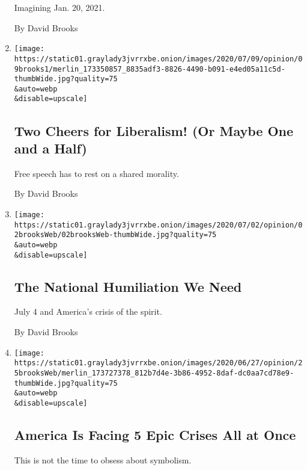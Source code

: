 \begin{enumerate}
  Imagining Jan. 20, 2021.

  By David Brooks
\item
  \href{/2020/07/09/opinion/liberalism-morality.html}{}

  \texttt{[image: https://static01.graylady3jvrrxbe.onion/images/2020/07/09/opinion/09brooks1/merlin\_173350857\_8835adf3-8826-4490-b091-e4ed05a11c5d-thumbWide.jpg?quality=75\\\&auto=webp\\\&disable=upscale]}

  \hypertarget{two-cheers-for-liberalism-or-maybe-one-and-a-half}{%
  \subsection{Two Cheers for Liberalism! (Or Maybe One and a
  Half)}\label{two-cheers-for-liberalism-or-maybe-one-and-a-half}}

  Free speech has to rest on a shared morality.

  By David Brooks
\item
  \href{/2020/07/02/opinion/coronavirus-july-4.html}{}

  \texttt{[image: https://static01.graylady3jvrrxbe.onion/images/2020/07/02/opinion/02brooksWeb/02brooksWeb-thumbWide.jpg?quality=75\\\&auto=webp\\\&disable=upscale]}

  \hypertarget{the-national-humiliation-we-need}{%
  \subsection{The National Humiliation We
  Need}\label{the-national-humiliation-we-need}}

  July 4 and America's crisis of the spirit.

  By David Brooks
\item
  \href{/2020/06/25/opinion/us-coronavirus-protests.html}{}

  \texttt{[image: https://static01.graylady3jvrrxbe.onion/images/2020/06/27/opinion/25brooksWeb/merlin\_173727378\_812b7d4e-3b86-4952-8daf-dc0aa7cd78e9-thumbWide.jpg?quality=75\\\&auto=webp\\\&disable=upscale]}

  \hypertarget{america-is-facing-5-epic-crises-all-at-once}{%
  \subsection{America Is Facing 5 Epic Crises All at
  Once}\label{america-is-facing-5-epic-crises-all-at-once}}

  This is not the time to obsess about symbolism.


\end{enumerate}
